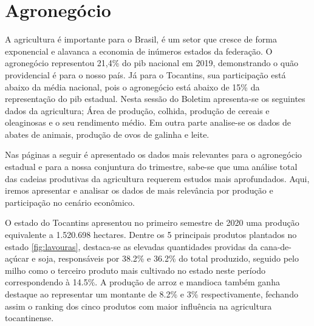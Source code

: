 \chapter{Agronegócio}
\par A agricultura é importante para o Brasil, é um setor que cresce de forma exponencial e alavanca a economia de inúmeros estados da federação. O agronegócio representou 21,4\% do \acrshort{pib} nacional em 2019, demonstrando o quão providencial é para o nosso país. Já para o Tocantins, sua participação está abaixo da média nacional, pois o agronegócio está abaixo de 15\% da representação do \acrshort{pib} estadual. Nesta sessão do Boletim apresenta-se os seguintes dados da agricultura; Área de produção, colhida, produção de cereais e oleaginosas e o seu rendimento médio. Em outra parte analise-se os dados de abates de animais, produção de ovos de galinha e leite.
\par Nas páginas a seguir é apresentado os dados mais relevantes para o agronegócio estadual e para a nossa conjuntura do trimestre, sabe-se que uma análise total das cadeias produtivas da agricultura requerem estudos mais aprofundados. Aqui, iremos apresentar e analisar os dados de mais relevância por produção e participação no cenário econômico.

\par O estado do Tocantins apresentou no primeiro semestre de 2020 uma produção  equivalente a 1.520.698 hectares. Dentre os 5 principais produtos plantados no estado \ref{fig:lavouras}, destaca-se as elevadas quantidades providas da cana-de-açúcar e soja, responsáveis por 38.2\% e 36.2\% do total produzido, seguido pelo milho como o terceiro produto mais cultivado no estado neste período correspondendo à 14.5\%. A produção de arroz e mandioca também ganha destaque ao representar um montante de 8.2\% e 3\% respectivamente, fechando assim o ranking dos cinco produtos com maior influência na agricultura tocantinense.

